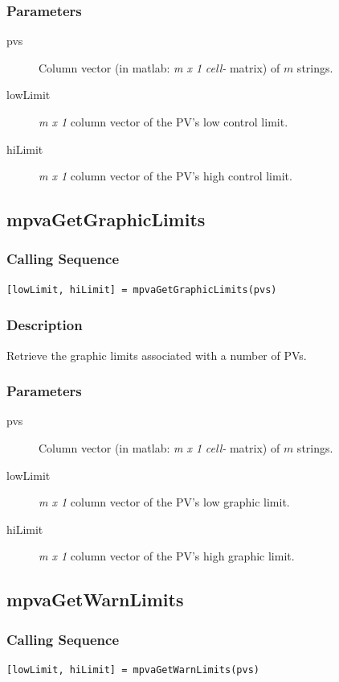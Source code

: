 \documentclass{article}
\newcommand{\pbrk}{\pagebreak[3]}
\newcommand{\ita}[1]{\emph{#1}}
\newcommand{\m}{$m$}
\newcommand{\mhack}{$m$} %
\newcommand{\mxl}{$m\times 1$}
\renewcommand{\m}{\ita{m}}
\newcommand{\mhack}{\ita{m}} %
\renewcommand{\mxl}{\ita{m x 1}}
\renewcommand{\pbrk}{}
\newcommand{\PVITEM}{
\item[pvs] Column vector (in matlab: \mxl{} \ita{cell-} matrix)
of \mhack{} strings.
}
\begin{document}
\subsubsection{Parameters}
\begin{description}
\PVITEM
\item[lowLimit] \mxl{} column vector of the PV's low control limit.
\item[hiLimit]  \mxl{} column vector of the PV's high control limit.
\end{description}


\vspace*{\fill}
\pbrk
\subsection{mpvaGetGraphicLimits}
\subsubsection{Calling Sequence}
\begin{verbatim}
[lowLimit, hiLimit] = mpvaGetGraphicLimits(pvs)
\end{verbatim}
\subsubsection{Description}
Retrieve the graphic limits associated with a number of PVs.
\subsubsection{Parameters}
\begin{description}
\PVITEM
\item[lowLimit] \mxl{} column vector of the PV's low graphic limit.
\item[hiLimit]  \mxl{} column vector of the PV's high graphic limit.
\end{description}

\vspace*{\fill}
\pbrk
\subsection{mpvaGetWarnLimits}
\subsubsection{Calling Sequence}
\begin{verbatim}
[lowLimit, hiLimit] = mpvaGetWarnLimits(pvs)
\end{verbatim}
\end{document}
